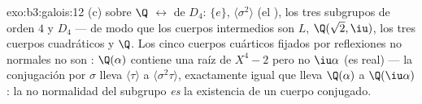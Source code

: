 \begin{solution}{exo:b3:galois:12}
(c)  sobre $\Q$
$\leftrightarrow$  de
$D_4$: $\{e\}$, $\langle\sigma^2\rangle$ (el
), los tres subgrupos de orden $4$
y $D_4$ --- de modo que los cuerpos intermedios
 son $L$, $\Q(\sqrt2, \iu)$, los
tres cuerpos cuadráticos y $\Q$. Los cinco cuerpos cuárticos fijados por
reflexiones no normales no son :
$\Q(\alpha)$ contiene una raíz de $X^4 - 2$ pero no $\iu\alpha$ (es
real) --- la conjugación por $\sigma$ lleva $\langle\tau\rangle$ a
$\langle\sigma^2\tau\rangle$, exactamente igual que lleva $\Q(\alpha)$ a
$\Q(\iu\alpha)$: la no normalidad del subgrupo \emph{es} la existencia
de un cuerpo conjugado.
\end{solution}

